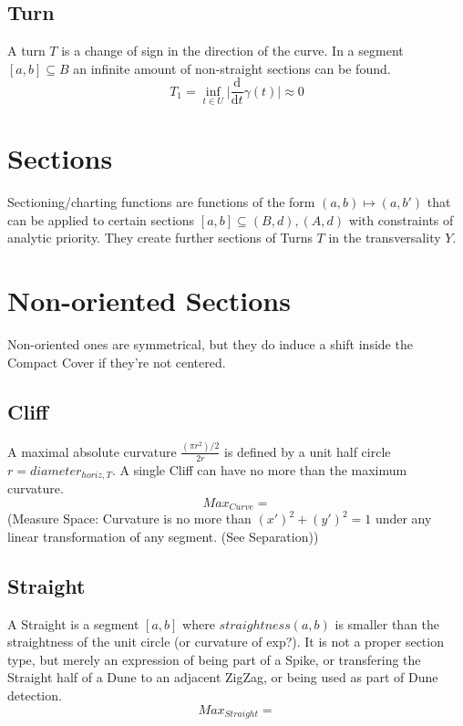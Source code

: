 \documentclass{report}
\begin{document}
\subsection{Turn}
A turn $T$ is a change of sign in the direction of the curve. In a segment $[a,b] \subseteq B$ an infinite amount of non-straight sections can be found.
\begin{equation}
T_{1} = \inf_{t \in U} \lvert \frac{\mathrm{d}}{\mathrm{d}t}\gamma(t) \rvert \approx 0
\end{equation}

\section*{Sections}
Sectioning/charting functions are functions of the form $(a,b) \mapsto (a,b')$ that can be applied to certain sections $[a,b] \subseteq (B,d),(A,d)$ with constraints of analytic priority. They create further sections of Turns $T$ in the transversality $Y$.

\section{Non-oriented Sections}
Non-oriented ones are symmetrical, but they do induce a shift inside the Compact Cover if they're not centered.

\subsection{Cliff}
A maximal absolute curvature $\frac{(\pi r^2) /2}{2r}$ is defined by a unit half circle $r=diameter_{horiz,T}$.
A single Cliff can have no more than the maximum curvature.
\begin{equation}
Max_{Curve}=
\end{equation}
(Measure Space: Curvature is no more than $(x')^2 + (y')^2 =1$  under any linear transformation of any segment. (See Separation))

\subsection{Straight}
A Straight is a segment $[a,b]$ where $straightness(a,b)$ is smaller than the straightness of the unit circle (or curvature of exp?). It is not a proper section type, but merely an expression of being part of a Spike, or transfering the Straight half of a Dune to an adjacent ZigZag, or being used as part of Dune detection.
\begin{equation}
Max_{Straight}=
\end{equation}
\end{document}
